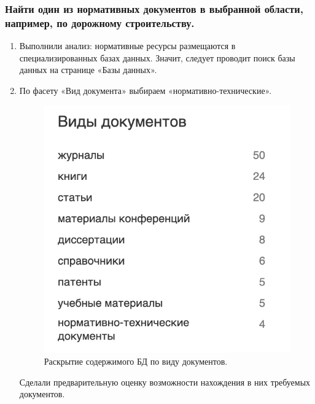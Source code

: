 \documentclass[14pt,a4paper,report]{report}
\begin{document}
\clearpage

\subsubsection{Найти один из нормативных документов в выбранной области, например, по дорожному строительству.}

\begin{enumerate}
\item Выполнили анализ: нормативные ресурсы размещаются в специализированных базах данных. Значит, следует проводит поиск базы данных на странице «Базы данных».
\item По фасету «Вид документа» выбираем «нормативно-технические».

\begin{figure}[h!]
\centering
\includegraphics[scale = 0.33]{137.png}
\caption{Раскрытие содержимого БД по виду документов.}
\label{image:1}
\end{figure}

Сделали предварительную оценку возможности нахождения в них требуемых документов.


\end{enumerate}
\end{document}
